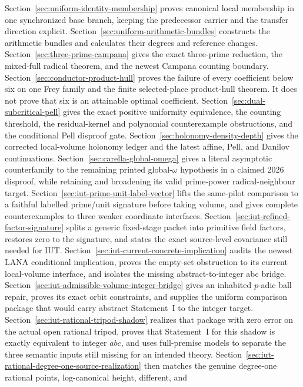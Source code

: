 \documentclass[11pt]{amsart}
\theoremstyle{definition}
\theoremstyle{remark}
\begin{document}
Section~\ref{sec:uniform-identity-membership} proves canonical local
membership in one synchronized base branch, keeping the predecessor
carrier and the transfer direction explicit.
Section~\ref{sec:uniform-arithmetic-bundles} constructs the arithmetic
bundles and calculates their degrees and reference changes.
Section~\ref{sec:three-prime-campana} gives the exact three-prime reduction,
the mixed-full radical theorem, and the newest Campana counting boundary.
Section~\ref{sec:conductor-product-hull} proves the failure of every
coefficient below six on one Frey family and the finite selected-place
product-hull theorem.  It does not prove that six is an attainable optimal
coefficient.
Section~\ref{sec:dual-subcritical-pell} gives the exact positive uniformity
equivalence, the counting threshold, the residual-kernel and polynomial
counterexample obstructions, and the conditional Pell disproof gate.
Section~\ref{sec:holonomy-density-depth} gives the corrected local-volume
holonomy ledger and the latest affine, Pell, and Danilov continuations.
Section~\ref{sec:carella-global-omega} gives a literal asymptotic
counterfamily to the remaining printed global-$\omega$ hypothesis in a
claimed 2026 disproof, while retaining and broadening its valid
prime-power radical-neighbour target.
Section~\ref{sec:iut-prime-unit-label-vector} lifts the same-pilot comparison
to a faithful labelled prime/unit signature before taking volume, and gives
complete counterexamples to three weaker coordinate interfaces.
Section~\ref{sec:iut-refined-factor-signature} splits a generic fixed-stage
packet into primitive field factors, restores zero to the signature, and
states the exact source-level covariance still needed for IUT.
Section~\ref{sec:iut-current-concrete-implication} audits the newest LANA
conditional implication, proves the empty-set obstruction to its current
local-volume interface, and isolates the missing abstract-to-integer abc
bridge.
Section~\ref{sec:iut-admissible-volume-integer-bridge} gives an inhabited
$p$-adic ball repair, proves its exact orbit constraints, and supplies the
uniform comparison package that would carry abstract Statement~I to the
integer target.
Section~\ref{sec:iut-rational-tripod-shadow} realizes that package with zero
error on the actual open rational tripod, proves that Statement~I for this
shadow is exactly equivalent to integer $abc$, and uses full-premise models
to separate the three semantic inputs still missing for an intended theory.
Section~\ref{sec:iut-rational-degree-one-source-realization} then matches the
genuine degree-one rational points, log-canonical height, different, and
\end{document}
